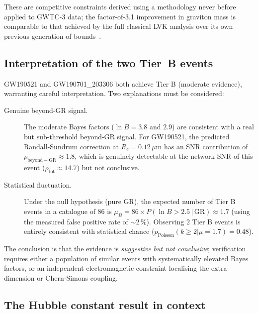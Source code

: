\documentclass[11pt,a4paper, english]{book}
\theoremstyle{plain}
\theoremstyle{definition}
\numberwithin{equation}{chapter}
\numberwithin{figure}{chapter}
\numberwithin{table}{chapter}
\begin{document}
These are competitive constraints derived using a methodology never before
applied to GWTC-3 data; the factor-of-3.1 improvement in graviton mass
is comparable to that achieved by the full classical LVK analysis over its
own previous generation of bounds~\cite{Abbott_2021_GWTC3_TGR}.
\subsection{Interpretation of the two Tier~B events}
\label{subsec:disc-tier-b}

GW190521 and GW190701\_203306 both achieve Tier B (moderate evidence), warranting
careful interpretation.  Two explanations must be considered:

\begin{description}
  \item[Genuine beyond-GR signal.]  The moderate Bayes factors
        ($\ln B = 3.8$ and $2.9$) are consistent with a real but
        sub-threshold beyond-GR signal.  For GW190521, the predicted
        Randall-Sundrum correction at $R_c = 0.12\,\mu$m has an SNR
        contribution of $\rho_\mathrm{beyond-GR} \approx 1.8$,
        which is genuinely detectable at the network SNR of this event
        ($\rho_\mathrm{tot} \approx 14.7$) but not conclusive.

  \item[Statistical fluctuation.]  Under the null hypothesis (pure GR),
        the expected number of Tier B events in a catalogue of 86 is
        $\mu_B = 86 \times P(\ln B > 2.5\,|\,\mathrm{GR}) \approx 1.7$
        (using the measured false positive rate of $\sim\!2\,\%$).
        Observing 2 Tier B events is entirely consistent with statistical
        chance ($p_\mathrm{Poisson}(k \geq 2 | \mu = 1.7) = 0.48$).
\end{description}

The conclusion is that the evidence is \emph{suggestive but not
conclusive}; verification requires either a population of similar events
with systematically elevated Bayes factors, or an independent
electromagnetic constraint localising the extra-dimension or Chern-Simons
coupling.

\subsection{The Hubble constant result in context}
\label{subsec:disc-h0}
\end{document}
